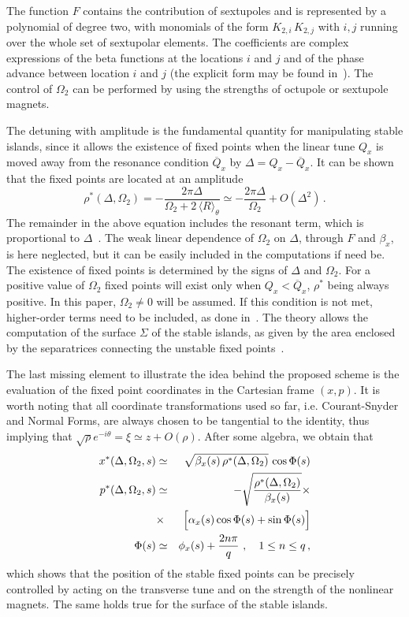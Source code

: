 \documentclass{article}
\begin{document}
The function $F$ contains the contribution of sextupoles and is represented by a polynomial of degree two, with monomials of the form $K_{2,i} \, K_{2,j}$ with $i, j$ running over the whole set of sextupolar elements. The coefficients are complex expressions of the beta functions at the locations $i$ and $j$ and of the phase advance between location $i$ and $j$ (the  explicit form may be found in~\cite{diego}). The control of $\Omega_2$ can be performed by using the strengths of octupole or sextupole magnets. 

The detuning with amplitude is the fundamental quantity for manipulating stable islands, since it allows the existence of fixed points when the linear tune $Q_x$ is moved away from the resonance condition $\overline{Q}_x$ by $\Delta=Q_x-\overline{Q}_x$. It can be shown that the fixed points are located at an amplitude
%
\begin{equation}\label{rho}
\rho^*(\Delta, \Omega_2)= -\frac{2\pi\Delta}{\Omega_2 + 
2 \, \langle R \rangle_\theta}
      \simeq-\frac{2\pi\Delta}{\Omega_2} + O(\Delta^2)\, .
\end{equation}
%
The remainder in the above equation includes the resonant term, which is proportional to $\Delta$~\cite{diego}. The weak linear dependence of $\Omega_2$ on $\Delta$, through $F$ and $\beta_x$, is here neglected, but it can be easily included in the computations if need be. The existence of fixed points is determined by the signs of $\Delta$ and $\Omega_2$. For a positive value of $\Omega_2$ fixed points will exist only when $Q_x< \overline{Q}_x$, $\rho^*$ being always positive. In this paper, $\Omega_2\ne 0$ will be assumed. If this condition is not met, higher-order terms need to be included, as done in~\cite{diego}. The theory allows the computation of the surface $\Sigma$ of the stable islands, as given by the area enclosed by the separatrices connecting the unstable fixed points~\cite{giallo}.

The last missing element to illustrate the idea behind the proposed scheme is the evaluation of the fixed point coordinates in the Cartesian frame $(x,p)$. It is worth noting that all coordinate transformations used so far, i.e. Courant-Snyder and Normal Forms, are always chosen to be tangential to the identity, thus implying that $\sqrt{\rho}e^{-i\theta}=\xi\simeq z + O(\rho)$. After some algebra, we obtain that 
%
\begin{eqnarray}
x^*(\Delta,\Omega_2,s)&\simeq&
	\sqrt{\beta_x(s)\, \rho^*(\Delta,\Omega_2)} \, \cos{\Phi(s)} 
	\label{x1}\\
p^*(\Delta,\Omega_2,s)&\simeq&-
	\sqrt{\frac{\rho^*(\Delta,\Omega_2)}{\beta_x(s)}} \times \nonumber \\
& \times & \Bigl[\alpha_x(s)\cos{\Phi(s)}+ \sin{\Phi(s)}\Bigr] \\  \label{p1}
\Phi(s)&\simeq&\phi_x(s)+\frac{2n\pi}{q}\ ,\quad 1 \leq n \leq q \, ,
\end{eqnarray}
%
which shows that the position of the stable fixed points can be precisely controlled by acting on the transverse tune and on the strength of the nonlinear magnets. The same holds true for the surface of the stable islands. 
\end{document}
